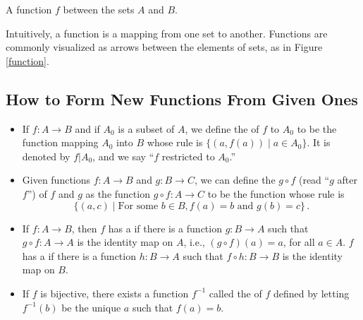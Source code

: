 \begin{marginfigure}
	\centering
	\caption{A function $f$ between the sets $A$ and 
		$B$.}\label{function}
\end{marginfigure}

Intuitively, a function is a mapping from one set to another. 
Functions are commonly visualized as arrows between the elements 
of sets, as in Figure \ref{function}.


\subsection{How to Form New Functions From Given Ones}

\begin{itemize}
	\item If $f : A \to B$ and if $A_0$ is a subset of $A$, 
	we define the  
	of $f$ to $A_0$ to be the function mapping $A_0$ into $B$ 
	whose rule is $\{ (a,f(a)) \mid a \in A_0 \}$. It is denoted 
	by $f|A_0$, and we say ``$f$ restricted to $A_0$.''
	
	\item Given functions $f : A \to B$ and $g : B \to C$, we 
	can define the  $g 
	\circ 
	f$ (read ``$g$ after $f$'') of $f$ and $g$ as the 
	function 
	$g \circ f : A \to C$ to be the function whose rule is
	\[
	\{ (a,c) \mid \text{For some } b \in B, f(a) = b \text{ 
		and } g(b) = c \}\,.
	\]
	
	\item If $f : A \to B$, then $f$ has a  if there is a function $g : B \to A$ such that $g \circ f : A \to A$ is the identity map on $A$, i.e., $(g \circ f)(a) = a$, for all $a \in A$. $f$ has a  if there is a function $h : B \to A$ such that $f \circ h : B \to B$ is the identity map on $B$.
	
	\item If $f$ is bijective, there exists a function 
	$f^{-1}$ called the  of 
	$f$ 
	defined by letting $f^{-1}(b)$ be the unique $a$ such 
	that $f(a) = b$.
\end{itemize}

